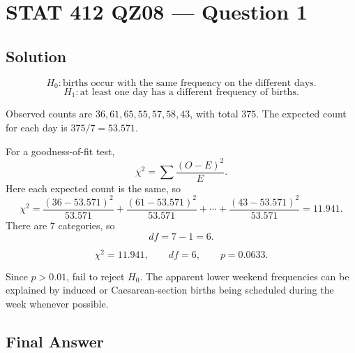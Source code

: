 \documentclass[11pt]{article}
\begin{document}
\section*{STAT 412 QZ08 --- Question 1}

\subsection*{Solution}

\[
H_0:\text{births occur with the same frequency on the different days.}
\]
\[
H_1:\text{at least one day has a different frequency of births.}
\]

Observed counts are \(36,61,65,55,57,58,43\), with total \(375\). The expected count for each day is \(375/7=53.571\).

For a goodness-of-fit test,
\[
\chi^2=\sum \frac{(O-E)^2}{E}.
\]
Here each expected count is the same, so
\[
\chi^2=
\frac{(36-53.571)^2}{53.571}
+\frac{(61-53.571)^2}{53.571}
+\cdots
+\frac{(43-53.571)^2}{53.571}
=11.941.
\]
There are \(7\) categories, so
\[
df=7-1=6.
\]

\[
\chi^2=11.941,\qquad df=6,\qquad p=0.0633.
\]

Since \(p>0.01\), fail to reject \(H_0\). The apparent lower weekend frequencies can be explained by induced or Caesarean-section births being scheduled during the week whenever possible.

\subsection*{Final Answer}

\end{document}
